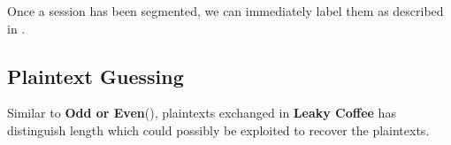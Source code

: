 \begin{example}
Once a session has been segmented, we can immediately label them as described in .

\subsection{Plaintext Guessing} \label{Sec: Plaintext Guessing}
Similar to \textbf{Odd or Even}(), plaintexts exchanged in \textbf{Leaky Coffee} has distinguish length which could possibly be exploited to recover the plaintexts.

%
%
%
%
%
%
%
%
%
%
%
%

\end{example}
